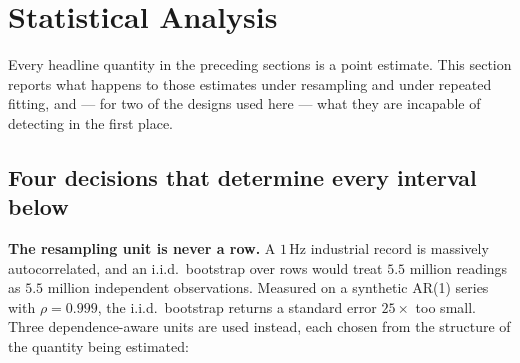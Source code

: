 %
%
%

\section{Statistical Analysis}
\label{sec:significance}

Every headline quantity in the preceding sections is a point estimate.
This section reports what happens to those estimates under resampling
and under repeated fitting, and --- for two of the designs used here ---
what they are incapable of detecting in the first place.

\subsection{Four decisions that determine every interval below}
\label{sec:significance:method}

\textbf{The resampling unit is never a row.} A $1$\,Hz industrial record
is massively autocorrelated, and an i.i.d.\ bootstrap over rows would
treat $5.5$ million readings as $5.5$ million independent observations.
Measured on a synthetic AR(1) series with $\rho=0.999$, the i.i.d.\
bootstrap returns a standard error $25\times$ too small. Three
dependence-aware units are used instead, each chosen from the structure
of the quantity being estimated:


